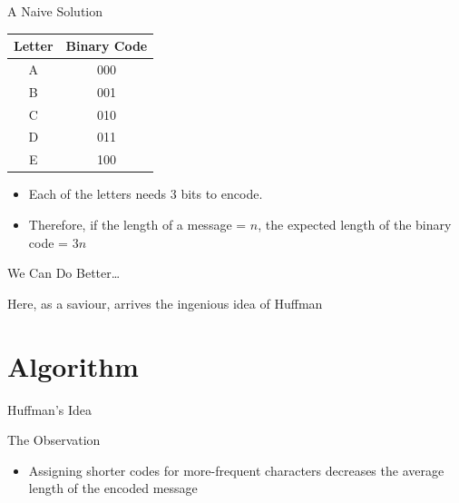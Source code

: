 \documentclass{beamer}
\begin{document}
	\begin{frame}{A Naive Solution}
		
		\begin{table}
			\begin{tabular}{c|c}
				\hline
				\onslide<1-> \textbf{Letter} & \textbf{Binary Code} \\
				\hline
				A & 000  \\
				B & 001  \\
				C & 010 \\
				D & 011 \\
				E & 100 
			\end{tabular}
		\end{table}
		
		\begin{block}
			
			\begin{itemize}
				\item Each of the letters needs 3 bits to encode.
				\item Therefore, if the length of a message = $n$, the expected length of the binary code = $3n$
			\end{itemize}
			
		\end{block}
		
	\end{frame}
	
	\begin{frame}{We Can Do Better\ldots}
		
		\begin{block}{}
			\centering
			Here, as a saviour, arrives the ingenious idea of Huffman
		\end{block}
		
	\end{frame}
	
	
	
	
	\section{Algorithm}
	
	\begin{frame}{Huffman's Idea}
		
		\onslide<1->
		\begin{block}{The Observation}
			
			\begin{itemize}
				
				\item Assigning shorter codes for more-frequent characters decreases the average length of the encoded message
				
			\end{itemize}
			
		\end{block}
		
	\end{frame}
	
\end{document}
